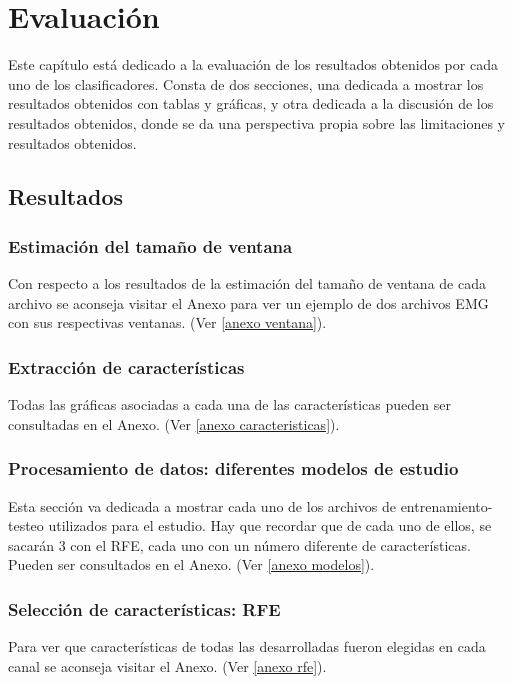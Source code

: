 \chapter{Evaluación}
Este capítulo está dedicado a la evaluación de los resultados obtenidos por cada uno de los clasificadores. Consta de dos secciones, una dedicada a mostrar los resultados obtenidos con tablas y gráficas, y otra dedicada a la discusión de los resultados obtenidos, donde se da una perspectiva propia sobre las limitaciones y resultados obtenidos.


\section{Resultados}

    \subsection{Estimación del tamaño de ventana}
    Con respecto a los resultados de la estimación del tamaño de ventana de cada archivo se aconseja visitar el Anexo para ver un ejemplo de dos archivos EMG con sus respectivas ventanas. (Ver \ref{anexo ventana}).

    \subsection{Extracción de características}
    Todas las gráficas asociadas a cada una de las características pueden ser consultadas en el Anexo. (Ver \ref{anexo caracteristicas}).

    \subsection{Procesamiento de datos: diferentes modelos de estudio}
   	Esta sección va dedicada a mostrar cada uno de los archivos de \newline entrenamiento-testeo utilizados para el estudio. Hay que recordar que de cada uno de ellos, se sacarán 3 con el RFE, cada uno con un número diferente de características. Pueden ser consultados en el Anexo. (Ver \ref{anexo modelos}).
	
	\subsection{Selección de características: RFE}
	Para ver que características de todas las desarrolladas fueron elegidas en cada canal se aconseja visitar el Anexo. (Ver \ref{anexo rfe}).
	
